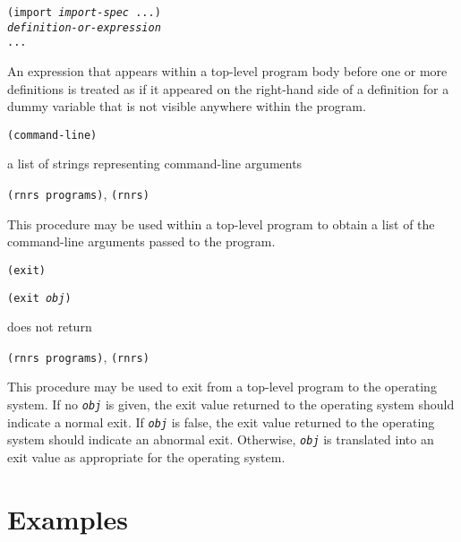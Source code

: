 \begin{alltt}
(import \textit{import-spec} ...)
\textit{definition-or-expression}
...
\end{alltt}


An expression that appears within a top-level program body before
one or more definitions is treated as if it appeared on
the right-hand side of a definition for a dummy variable that is not
visible anywhere within the program.


\begin{description}

\label{libraries_s17}\item[procedure] \texttt{(command-line)}



\item[returns] a list of strings representing command-line arguments


\item[libraries] \texttt{(rnrs programs)}, \texttt{(rnrs)}
\end{description}


This procedure may be used within a top-level program to obtain a list
of the command-line arguments passed to the program.

\begin{description}

\label{libraries_s18}\item[procedure] \texttt{(exit)}



\item[procedure] \texttt{(exit \textit{obj})}



\item[returns] does not return


\item[libraries] \texttt{(rnrs programs)}, \texttt{(rnrs)}
\end{description}


This procedure may be used to exit from a top-level program to the
operating system.
If no \texttt{\textit{obj}} is given, the exit value returned to the operating
system should indicate a normal exit.
If \texttt{\textit{obj}} is false, the exit value returned to the operating
system should indicate an abnormal exit.
Otherwise, \texttt{\textit{obj}} is translated into an exit value as
appropriate for the operating system.



\section{\label{libraries_g146}\label{libraries_h4}Examples\label{libraries_SECTLIBEXAMPLES}}



